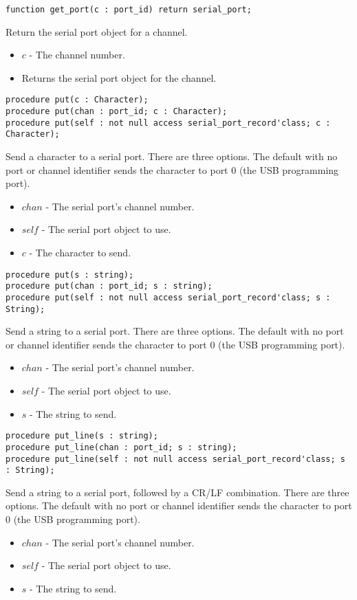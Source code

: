 \documentclass[10pt, openany]{book}
\newcommand{\indexfunc}[1]{\index[func]{#1}}
\begin{document}
\begin{lstlisting}
function get_port(c : port_id) return serial_port;
\end{lstlisting}
\indexfunc{get\_port}
Return the serial port object for a channel.
\begin{itemize}
  \item $c$ - The channel number.
  \item Returns the serial port object for the channel.
\end{itemize}

\begin{lstlisting}
procedure put(c : Character);
procedure put(chan : port_id; c : Character);
procedure put(self : not null access serial_port_record'class; c : Character);
\end{lstlisting}
\indexfunc{put}
Send a character to a serial port.  There are three options.  The default with no port or channel identifier sends the character to port 0 (the USB programming port).
\begin{itemize}
  \item $chan$ - The serial port's channel number.
  \item $self$ - The serial port object to use.
  \item $c$ - The character to send.
\end{itemize}

\begin{lstlisting}
procedure put(s : string);
procedure put(chan : port_id; s : string);
procedure put(self : not null access serial_port_record'class; s : String);
\end{lstlisting}
\indexfunc{put}
Send a string to a serial port.  There are three options.  The default with no port or channel identifier sends the character to port 0 (the USB programming port).
\begin{itemize}
  \item $chan$ - The serial port's channel number.
  \item $self$ - The serial port object to use.
  \item $s$ - The string to send.
\end{itemize}

\begin{lstlisting}
procedure put_line(s : string);
procedure put_line(chan : port_id; s : string);
procedure put_line(self : not null access serial_port_record'class; s : String);
\end{lstlisting}
\indexfunc{put\_line}
Send a string to a serial port, followed by a CR/LF combination.  There are three options.  The default with no port or channel identifier sends the character to port 0 (the USB programming port).
\begin{itemize}
  \item $chan$ - The serial port's channel number.
  \item $self$ - The serial port object to use.
  \item $s$ - The string to send.
\end{itemize}
\end{document}
